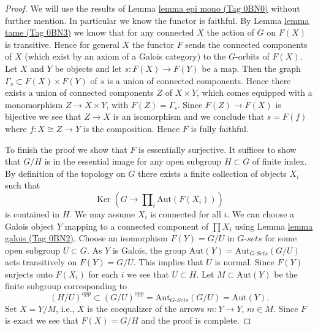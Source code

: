 \documentclass{amsart}
\theoremstyle{plain}
\theoremstyle{definition}
\theoremstyle{remark}
\numberwithin{equation}{subsection}
\def\Ker{\mathop{\mathrm{Ker}}}
\begin{document}
\begin{proof}
We will use the results of Lemma \href{https://stacks.math.columbia.edu/tag/0BN0}{lemma epi mono (Tag 0BN0)} without further mention.
In particular we know the functor is faithful.
By Lemma \href{https://stacks.math.columbia.edu/tag/0BN3}{lemma tame (Tag 0BN3)} we know that for any connected $X$ the
action of $G$ on $F(X)$ is transitive. Hence for general $X$ the functor
$F$ sends the connected components of $X$ (which exist by
an axiom of a Galois category) to the $G$-orbits of $F(X)$.
Let $X$ and $Y$ be objects and let
$s : F(X) \to F(Y)$ be a map. Then the graph
$\Gamma_s \subset F(X) \times F(Y)$ of $s$
is a union of connected components. Hence there exists a
union of connected components $Z$ of $X \times Y$,
which comes equipped with a monomorphism $Z \to X \times Y$,
with $F(Z) = \Gamma_s$. Since $F(Z) \to F(X)$ is bijective
we see that $Z \to X$ is an isomorphism and we conclude
that $s = F(f)$ where $f : X \cong Z \to Y$ is the composition.
Hence $F$ is fully faithful.

\medskip\noindent
To finish the proof we show that $F$ is essentially surjective.
It suffices to show that $G/H$ is in the essential image for
any open subgroup $H \subset G$ of finite index.
By definition of the topology on $G$ there exists a finite
collection of objects $X_i$ such that
$$
\Ker(G \longrightarrow \prod\nolimits_i \text{Aut}(F(X_i)))
$$
is contained in $H$. We may assume $X_i$ is connected
for all $i$. We can choose a Galois object $Y$ mapping
to a connected component of $\prod X_i$ using
Lemma \href{https://stacks.math.columbia.edu/tag/0BN2}{lemma galois (Tag 0BN2)}. Choose an isomorphism $F(Y) = G/U$
in $G\textit{-sets}$ for some open subgroup $U \subset G$.
As $Y$ is Galois, the group
$\text{Aut}(Y) = \text{Aut}_{G\textit{-Sets}}(G/U)$ acts transitively
on $F(Y) = G/U$. This implies that $U$ is normal. Since
$F(Y)$ surjects onto $F(X_i)$ for each $i$ we see that
$U \subset H$. Let $M \subset \text{Aut}(Y)$ be the finite subgroup
corresponding to
$$
(H/U)^{opp} \subset (G/U)^{opp} = \text{Aut}_{G\textit{-Sets}}(G/U)
= \text{Aut}(Y).
$$
Set $X = Y/M$, i.e., $X$ is the coequalizer
of the arrows $m : Y \to Y$, $m \in M$.
Since $F$ is exact we see that $F(X) = G/H$ and the
proof is complete.
\end{proof}
\end{document}

